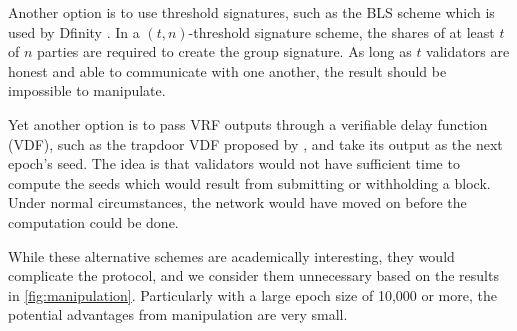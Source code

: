 Another option is to use threshold signatures, such as the BLS scheme which is used by Dfinity \cite{hanke2018dfinity}. In a $(t,n)$-threshold signature scheme, the shares of at least $t$ of $n$ parties are required to create the group signature. As long as $t$ validators are honest and able to communicate with one another, the result should be impossible to manipulate.

Yet another option is to pass VRF outputs through a verifiable delay function (VDF), such as the trapdoor VDF proposed by \cite{wesolowski2018efficient}, and take its output as the next epoch's seed. The idea is that validators would not have sufficient time to compute the seeds which would result from submitting or withholding a block. Under normal circumstances, the network would have moved on before the computation could be done.

While these alternative schemes are academically interesting, they would complicate the protocol, and we consider them unnecessary based on the results in \autoref{fig:manipulation}. Particularly with a large epoch size of 10,000 or more, the potential advantages from manipulation are very small.
